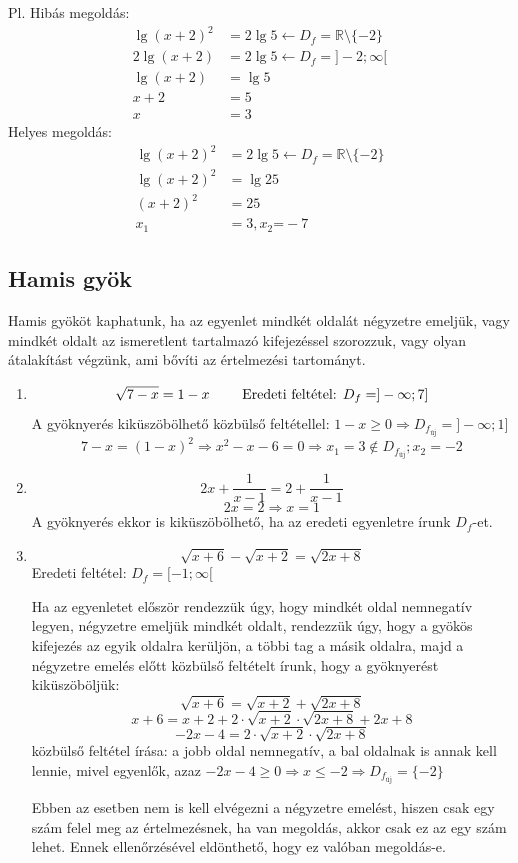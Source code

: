 \documentclass[12pt,a4paper]{article}
\begin{document}
Pl. Hibás megoldás:
\begin{align*}
\lg(x+2)^2&=2\lg 5 \leftarrow D_f=\mathbb{R}\setminus \{-2\} \\
2\lg(x+2)&=2\lg 5 \leftarrow D_f= ]-2;\infty [\\
\lg(x+2)&=\lg 5 \\
x+2&=5 \\
x&=3
\end{align*}
Helyes megoldás:
\begin{align*}
\lg(x+2)^2&=2\lg 5 \leftarrow D_f=\mathbb{R}\setminus \{-2\} \\
\lg(x+2)^2&=\lg 25\\
(x+2)^2&= 25\\
x_1&=3, x_2\text{=}-7
\end{align*}

\subsection{Hamis gyök}
Hamis gyököt kaphatunk, ha az egyenlet mindkét oldalát négyzetre emeljük, vagy mindkét oldalt az ismeretlent tartalmazó kifejezéssel szorozzuk, vagy olyan átalakítást végzünk, ami bővíti az értelmezési tartományt.

\begin{enumerate}
\item $$\sqrt{7-x}=1-x \hspace{20px} \text{ Eredeti feltétel: } D_f = ]-\infty; 7] $$
A gyöknyerés kiküszöbölhető közbülső feltétellel: $1-x \geq 0 \Rightarrow D_{f_{\text{új}}}=]-\infty; 1]$
$$7-x=(1-x)^2 \Rightarrow x^2-x-6=0 \Rightarrow x_1=3 \notin D_{f_{\text{új}}}; x_2=-2 $$
\item $$2x+\dfrac{1}{x-1}=2+\dfrac{1}{x-1}$$
$$2x=2 \Rightarrow x=1$$
A gyöknyerés ekkor is kiküszöbölhető, ha az eredeti egyenletre írunk $D_f$-et.
\item $$\sqrt{x+6}-\sqrt{x+2}=\sqrt{2x+8}$$
Eredeti feltétel: $D_f=[-1; \infty[$

Ha az egyenletet először rendezzük úgy, hogy mindkét oldal nemnegatív legyen, négyzetre emeljük mindkét oldalt, rendezzük úgy, hogy a gyökös kifejezés az egyik oldalra kerüljön, a többi tag a másik oldalra, majd a négyzetre emelés előtt közbülső feltételt írunk, hogy a gyöknyerést kiküszöböljük:
$$\sqrt{x+6}=\sqrt{x+2}+\sqrt{2x+8}$$
$$x+6=x+2+2\cdot \sqrt{x+2}\cdot\sqrt{2x+8} + 2x+8$$
$$-2x-4=2\cdot \sqrt{x+2}\cdot\sqrt{2x+8}$$
közbülső feltétel írása: a jobb oldal nemnegatív, a bal oldalnak is annak kell lennie, mivel egyenlők, azaz $-2x-4\geq 0 \Rightarrow x \leq -2 \Rightarrow D_{f_{\text{új}}} = \{-2\}$ 

Ebben az esetben nem is kell elvégezni a négyzetre emelést, hiszen csak egy szám felel meg az értelmezésnek, ha van megoldás, akkor csak ez az egy szám lehet. Ennek ellenőrzésével eldönthető, hogy ez valóban megoldás-e.
\end{enumerate}
\end{document}
